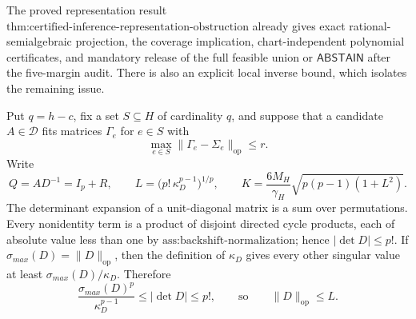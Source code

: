 The proved representation result \(\text{thm:certified-inference-representation-obstruction}\) already gives exact rational-semialgebraic projection, the coverage implication, chart-independent polynomial certificates, and mandatory release of the full feasible union or \(\mathsf{ABSTAIN}\) after the five-margin audit.  There is also an explicit local inverse bound, which isolates the remaining issue.

Put \(q=h-c\), fix a set \(S\subseteq H\) of cardinality \(q\), and suppose that a candidate \(A\in\mathcal D\) fits matrices \(\Gamma_e\) for \(e\in S\) with
\[
 \max_{e\in S}\|\Gamma_e-\Sigma_e\|_{\mathrm{op}}\le r.
\]
Write
\[
 Q=AD^{-1}=I_p+R,
 \qquad
 L=\bigl(p!\,\kappa_D^{p-1}\bigr)^{1/p},
 \qquad
 K=\frac{6M_H}{\gamma_H}
 \sqrt{p(p-1)(1+L^2)}.
\]
The determinant expansion of a unit-diagonal matrix is a sum over permutations.  Every nonidentity term is a product of disjoint directed cycle products, each of absolute value less than one by \(\text{ass:backshift-normalization}\); hence \(|\det D|\le p!\).  If \(\sigma_{max}(D)=\|D\|_{\mathrm{op}}\), then the definition of \(\kappa_D\) gives every other singular value at least \(\sigma_{max}(D)/\kappa_D\).  Therefore
\[
 \frac{\sigma_{max}(D)^p}{\kappa_D^{p-1}}
 \le |\det D|\le p!,
 \qquad\text{so}\qquad
 \|D\|_{\mathrm{op}}\le L.
 \tag{1}
\]


